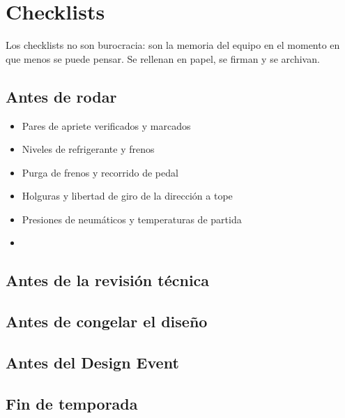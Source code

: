 \chapter{Checklists}
\label{ch:checklists}

Los checklists no son burocracia: son la memoria del equipo en el momento en que
menos se puede pensar. Se rellenan en papel, se firman y se archivan.

\section{Antes de rodar}
\label{sec:check_rodaje}

\begin{itemize}[label=$\square$]
  \item Pares de apriete verificados y marcados
  \item Niveles de refrigerante y frenos
  \item Purga de frenos y recorrido de pedal
  \item Holguras y libertad de giro de la dirección a tope
  \item Presiones de neumáticos y temperaturas de partida
  \item {}
\end{itemize}

\section{Antes de la revisión técnica}
\label{sec:check_scrutineering}

\section{Antes de congelar el diseño}
\label{sec:check_congelacion}

\section{Antes del Design Event}
\label{sec:check_design}

\section{Fin de temporada}
\label{sec:check_fin_temporada}
